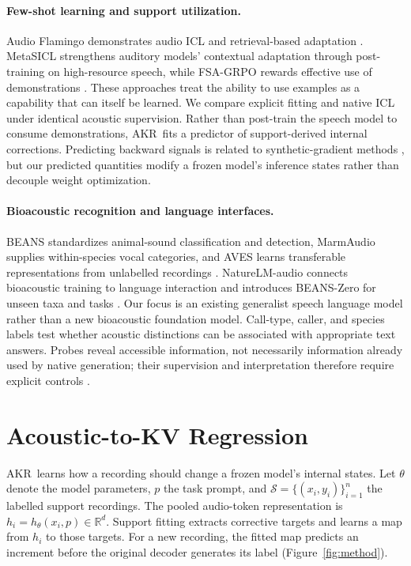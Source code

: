 \documentclass{article}
\newcommand{\method}{AKR}
\newcommand{\R}{\mathbb R}
\newcommand{\Sset}{\mathcal S}
\begin{document}
\paragraph{Few-shot learning and support utilization.}
Audio Flamingo demonstrates audio ICL and retrieval-based adaptation \citep{kong2024audioflamingo}. MetaSICL strengthens auditory models' contextual adaptation through post-training on high-resource speech, while FSA-GRPO rewards effective use of demonstrations \citep{zheng2026metasicl,zheng2026fsagrpo}. These approaches treat the ability to use examples as a capability that can itself be learned. We compare explicit fitting and native ICL under identical acoustic supervision. Rather than post-train the speech model to consume demonstrations, \method\ fits a predictor of support-derived internal corrections. Predicting backward signals is related to synthetic-gradient methods \citep{jaderberg2017synthetic}, but our predicted quantities modify a frozen model's inference states rather than decouple weight optimization.

\paragraph{Bioacoustic recognition and language interfaces.}
BEANS standardizes animal-sound classification and detection, MarmAudio supplies within-species vocal categories, and AVES learns transferable representations from unlabelled recordings \citep{hagiwara2022beans,lamothe2025marmaudio,hagiwara2022aves}. NatureLM-audio connects bioacoustic training to language interaction and introduces BEANS-Zero for unseen taxa and tasks \citep{robinson2025naturelm}. Our focus is an existing generalist speech language model rather than a new bioacoustic foundation model. Call-type, caller, and species labels test whether acoustic distinctions can be associated with appropriate text answers. Probes reveal accessible information, not necessarily information already used by native generation; their supervision and interpretation therefore require explicit controls \citep{hewitt2019probes}.

\section{Acoustic-to-KV Regression}
\label{sec:method}
\method\ learns how a recording should change a frozen model's internal states. Let $\theta$ denote the model parameters, $p$ the task prompt, and $\Sset=\{(x_i,y_i)\}_{i=1}^{n}$ the labelled support recordings. The pooled audio-token representation is $h_i=h_\theta(x_i,p)\in\R^d$. Support fitting extracts corrective targets and learns a map from $h_i$ to those targets. For a new recording, the fitted map predicts an increment before the original decoder generates its label (Figure~\ref{fig:method}).
\end{document}
